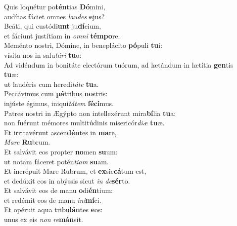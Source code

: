 \evenverse Quis loquétur po\textbf{tén}tias \textbf{Dó}mini,~\*\\
\evenverse audítas fáciet omnes \textit{lau}\textit{des} \textbf{e}jus?\\
\oddverse Beáti, qui custódi\textbf{unt} ju\textbf{dí}cium,~\*\\
\oddverse et fáciunt justítiam in \textit{om}\textit{ni} \textbf{tém}\textbf{po}re.\\
\evenverse Meménto nostri, Dómine, in beneplácito \textbf{pó}puli \textbf{tu}i:~\*\\
\evenverse vísita nos in salu\textit{tá}\textit{ri} \textbf{tu}o:\\
\oddverse Ad vidéndum in bonitáte electórum tuórum, ad lætándum in lætítia \textbf{gen}tis \textbf{tu}æ:~\*\\
\oddverse ut laudéris cum heredi\textit{tá}\textit{te} \textbf{tu}a.\\
\evenverse Peccávimus cum \textbf{pá}tribus \textbf{no}stris:~\*\\
\evenverse injúste égimus, iniqui\textit{tá}\textit{tem} \textbf{fé}\textbf{ci}mus.\\
\oddverse Patres nostri in Ægýpto non intellexérunt mira\textbf{bí}lia \textbf{tu}a:~\*\\
\oddverse non fuérunt mémores multitúdinis misericór\textit{di}\textit{æ} \textbf{tu}æ.\\
\evenverse Et irritavérunt ascen\textbf{dén}tes in \textbf{ma}re,~\*\\
\evenverse \textit{Ma}\textit{re} \textbf{Ru}brum.\\
\oddverse Et salvávit eos propter \textbf{no}men \textbf{su}um:~\*\\
\oddverse ut notam fáceret potén\textit{ti}\textit{am} \textbf{su}am.\\
\evenverse Et incrépuit Mare Rubrum, et \textbf{ex}sic\textbf{cá}tum est,~\*\\
\evenverse et dedúxit eos in abýssis sicut \textit{in} \textit{de}\textbf{sér}to.\\
\oddverse Et salvávit eos de manu \textbf{o}di\textbf{én}tium:~\*\\
\oddverse et redémit eos de manu \textit{i}\textit{ni}\textbf{mí}ci.\\
\evenverse Et opéruit aqua tribu\textbf{lán}tes \textbf{e}os:~\*\\
\evenverse unus ex eis \textit{non} \textit{re}\textbf{mán}sit.\\
